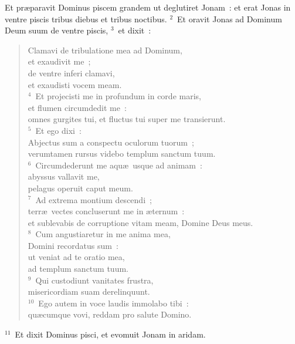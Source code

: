 \lettrine[lines=3,image=true,loversize=0.05,lraise=-0.03]{E}{}t pr\ae paravit Dominus piscem grandem ut deglutiret Jonam~: et erat Jonas in ventre piscis tribus diebus et tribus noctibus.
${}^{2}$~Et oravit Jonas ad Dominum Deum suum de ventre piscis,
${}^{3}$~et dixit~: \begin{flushleft}\begin{verse}Clamavi de tribulatione mea ad Dominum,\\ et exaudivit me~;\\ de ventre inferi clamavi,\\ et exaudisti vocem meam.\\
${}^{4}$~Et projecisti me in profundum in corde maris,\\ et flumen circumdedit me~:\\ omnes gurgites tui, et fluctus tui super me transierunt.\\
${}^{5}$~Et ego dixi~:\\ Abjectus sum a conspectu oculorum tuorum~;\\ verumtamen rursus videbo templum sanctum tuum.\\
${}^{6}$~Circumdederunt me aqu\ae\ usque ad animam~:\\ abyssus vallavit me,\\ pelagus operuit caput meum.\\
${}^{7}$~Ad extrema montium descendi~;\\ terr\ae\ vectes concluserunt me in \ae ternum~:\\ et sublevabis de corruptione vitam meam, Domine Deus meus.\\
${}^{8}$~Cum angustiaretur in me anima mea,\\ Domini recordatus sum~:\\ ut veniat ad te oratio mea,\\ ad templum sanctum tuum.\\
${}^{9}$~Qui custodiunt vanitates frustra,\\ misericordiam suam derelinquunt.\\
${}^{10}$~Ego autem in voce laudis immolabo tibi~:\\ qu\ae cumque vovi, reddam pro salute Domino.\end{verse}\end{flushleft}


${}^{11}$~Et dixit Dominus pisci, et evomuit Jonam in aridam.

